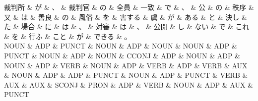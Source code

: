 \documentclass[tikz,border=5pt]{standalone}
\begin{document}
\small
\begin{dependency}[edge unit distance=10.9pt]
    \begin{deptext}[column sep=0.5em]
        裁判所 \& が \& 、 \& 裁判官 \& の \& 全員 \& 一致 \& で \& 、 \& 公 \& の \& 秩序 \& 又 \& は \& 善良 \& の \& 風俗 \& を \& 害する \& 虞 \& が \& ある \& と \& 決し \& た \& 場合 \& に \& は \& 、 \& 対審 \& は \& 、 \& 公開 \& し \& ない \& で \& これ \& を \& 行ふ \& こと \& が \& できる \& 。\\
        NOUN \& ADP \& PUNCT \& NOUN \& ADP \& NOUN \& NOUN \& ADP \& PUNCT \& NOUN \& ADP \& NOUN \& CCONJ \& ADP \& NOUN \& ADP \& NOUN \& ADP \& VERB \& NOUN \& ADP \& VERB \& ADP \& VERB \& AUX \& NOUN \& ADP \& ADP \& PUNCT \& NOUN \& ADP \& PUNCT \& VERB \& AUX \& AUX \& SCONJ \& PRON \& ADP \& VERB \& NOUN \& ADP \& AUX \& PUNCT\\
    \end{deptext}
\end{dependency}
\end{document}
